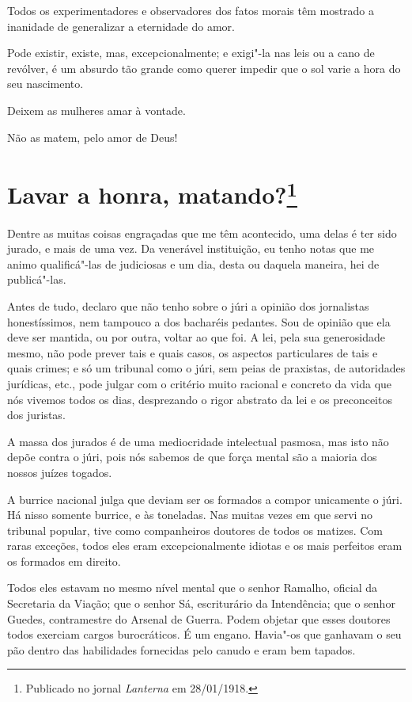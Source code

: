 Todos os experimentadores e observadores dos fatos morais têm mostrado a
inanidade de generalizar a eternidade do amor.

Pode existir, existe, mas, excepcionalmente; e exigi"-la nas leis ou a
cano de revólver, é um absurdo tão grande como querer impedir que o sol
varie a hora do seu nascimento.

Deixem as mulheres amar à vontade.

Não as matem, pelo amor de Deus!

\chapter[Lavar a honra, matando?]{Lavar a honra, matando?\footnote[*]{Publicado no jornal \emph{Lanterna} em 28/01/1918.}}

Dentre as muitas coisas engraçadas que me têm acontecido, uma delas é
ter sido jurado, e mais de uma vez. Da venerável instituição, eu tenho
notas que me animo qualificá"-las de judiciosas e um dia, desta ou
daquela maneira, hei de publicá"-las.

Antes de tudo, declaro que não tenho sobre o júri a opinião dos
jornalistas honestíssimos, nem tampouco a dos bacharéis pedantes. Sou de
opinião que ela deve ser mantida, ou por outra, voltar ao que foi. A
lei, pela sua generosidade mesmo, não pode prever tais e quais casos, os
aspectos particulares de tais e quais crimes; e só um tribunal como o
júri, sem peias de praxistas, de autoridades jurídicas, etc., pode
julgar com o critério muito racional e concreto da vida que nós vivemos
todos os dias, desprezando o rigor abstrato da lei e os preconceitos dos
juristas.

A massa dos jurados é de uma mediocridade intelectual pasmosa, mas isto
não depõe contra o júri, pois nós sabemos de que força mental são a
maioria dos nossos juízes togados.

A burrice nacional julga que deviam ser os formados a compor unicamente
o júri. Há nisso somente burrice, e às toneladas. Nas muitas vezes em
que servi no tribunal popular, tive como companheiros doutores de todos
os matizes. Com raras exceções, todos eles eram excepcionalmente idiotas
e os mais perfeitos eram os formados em direito.

Todos eles estavam no mesmo nível mental que o senhor Ramalho, oficial
da Secretaria da Viação; que o senhor Sá, escriturário da Intendência;
que o senhor Guedes, contramestre do Arsenal de Guerra. Podem objetar
que esses doutores todos exerciam cargos burocráticos. É um engano.
Havia"-os que ganhavam o seu pão dentro das habilidades fornecidas pelo
canudo e eram bem tapados.

